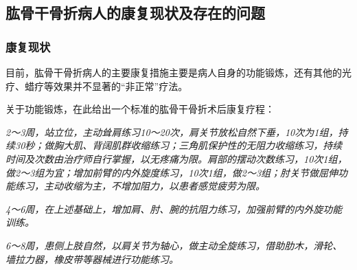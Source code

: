 \documentclass[UTF8]{ctexart}
\begin{document}
    \subsection{肱骨干骨折病人的康复现状及存在的问题}
        \subsubsection{康复现状}
            目前，肱骨干骨折病人的主要康复措施主要是病人自身的功能锻炼，还有其他的光疗、蜡疗等效果并不显著的“非正常”疗法。

            关于功能锻炼，在此给出一个标准的肱骨干骨折术后康复疗程：
            \begin{shaded}
                \textsl{
                    2～3周，站立位，主动耸肩练习10～20次，肩关节放松自然下垂，10次为1组，持续30秒；做胸大肌、背阔肌群收缩练习；三角肌保护性的无阻力收缩练习，持续时间及次数由治疗师自行掌握，以无疼痛为限。肩部的摆动次数练习，10次1组，做2～3组为宜；增加前臂的内外旋度练习，10次1组，做2～3组；肘关节做屈伸功能练习，主动收缩为主，不增加阻力，以患者感觉疲劳为限。}
                
                    \textsl{4～6周，在上述基础上，增加肩、肘、腕的抗阻力练习，加强前臂的内外旋功能训练。}
                
                    \textsl{6～8周，患侧上肢自然，以肩关节为轴心，做主动全旋练习，借助肋木，滑轮、墙拉力器，橡皮带等器械进行功能练习。}
            \end{shaded}
\end{document}
